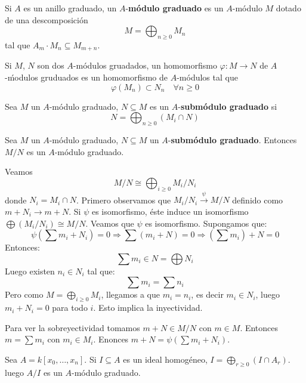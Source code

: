 \documentclass[ACGA.tex]{subfiles}
\begin{document}
\begin{defi}
Si $A$ es un anillo graduado, un $A$-\textbf{módulo graduado} es un $A$-módulo $M$ dotado de una descomposición
\[ M = \bigoplus_{n≥0} M_n \]
tal que $A_m \cdot M_n \subseteq M_{m+n}$.
\end{defi}

\begin{defi}
Si $M$, $N$ son dos $A$-módulos gruadados, un homomorfismo $φ : M \to N$ de $A$-ḿodulos gruduados es un homomorfismo de $A$-módulos tal que
\[ φ(M_n) \subset N_n \quad \forall n ≥ 0 \]
\end{defi}

\begin{defi}
Sea $M$ un $A$-módulo graduado, $N \subseteq M$ es un $A$-\textbf{submódulo graduado} si
\[ N = \bigoplus_{n≥0} (M_i \cap N) \]
\end{defi}

\begin{teorema}
Sea $M$ un $A$-módulo graduado, $N \subseteq M$ un $A$-\textbf{submódulo graduado}. Entonces $M/N$ es un $A$-módulo graduado. 
\end{teorema}
\begin{dem}
Veamos
\[ M/N \cong \bigoplus_{i≥0} M_i / N_i \]
donde $N_i = M_i \cap N$. Primero observamos que $M_i/N_i \xrightarrow{ψ} M/N$ definido como $m + N_i \to m+N$. Si $ψ$ es isomorfismo, éste induce un isomorfismo $\bigoplus (M_i/N_i) \cong M/N$. Veamos que $ψ$ es isomorfismo. Supongamos que:
\[ ψ\left(\sum m_i + N_i\right) = 0 \Rightarrow  \sum \left(m_i + N\right) = 0 \Rightarrow  \left(\sum m_i\right) + N = 0\]
Entonces:
\[ \sum m_i \in N = \bigoplus N_i \]
Luego existen $n_i \in N_i$ tal que:
\[ \sum m_i = \sum n_i\]
Pero como $M = \bigoplus_{i≥0} M_i$, llegamos a que $m_i = n_i$, es decir $m_i \in N_i$, luego $m_i + N_i = 0$ para todo $i$. Esto implica la inyectividad.

Para ver la sobreyectividad tomamos $m+N \in M/N$ con $m \in M$. Entonces $m = \sum m_i$ con $m_i \in M_i$. Enonces $m+N = ψ\left(\sum m_i + N_i\right)$.
\end{dem}

\begin{ej}
Sea $A = k[x_0,\dots,x_n]$. Si $I \subseteq A$ es un ideal homogéneo, $I = \bigoplus_{r≥0} \left(I \cap A_r\right)$. luego $A/I$ es un $A$-módulo graduado.
\end{ej}
\end{document}
